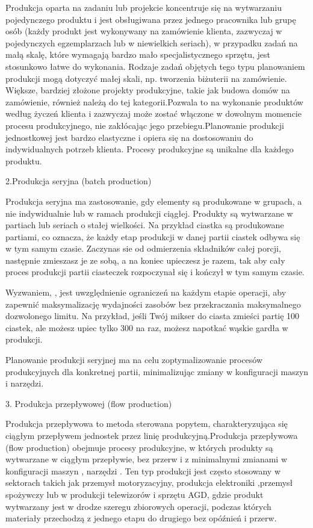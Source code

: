 Produkcja oparta na zadaniu lub projekcie koncentruje się na wytwarzaniu pojedynczego produktu i jest obsługiwana przez jednego pracownika lub grupę osób (każdy produkt jest wykonywany na zamówienie klienta, zazwyczaj w pojedynczych egzemplarzach lub w niewielkich seriach), w przypadku zadań na małą skalę, które wymagają bardzo mało specjalistycznego sprzętu, jest stosunkowo łatwe do wykonania. Rodzaje zadań objętych tego typu planowaniem produkcji mogą dotyczyć małej skali, np. tworzenia biżuterii na zamówienie. Większe, bardziej złożone projekty produkcyjne, takie jak budowa domów na zamówienie, również należą do tej kategorii.Pozwala to na wykonanie produktów według życzeń klienta i zazwyczaj może zostać włączone w dowolnym momencie procesu produkcyjnego, nie zakłócając jego przebiegu.Planowanie produkcji jednostkowej jest bardzo elastyczne i opiera się na dostosowaniu do indywidualnych potrzeb klienta. Procesy produkcyjne są unikalne dla każdego produktu.


2.Produkcja seryjna (batch production)

Produkcja seryjna ma zastosowanie, gdy elementy są produkowane w grupach, a nie indywidualnie lub w ramach produkcji ciągłej. Produkty są wytwarzane w partiach lub seriach o stałej wielkości. Na przykład ciastka są produkowane partiami, co oznacza, że każdy etap produkcji w danej partii ciastek odbywa się w tym samym czasie. Zaczynas sie od odmierzenia składników całej porcji, następnie zmieszasz je ze sobą, a na koniec upieczesz je razem, tak aby cały proces produkcji partii ciasteczek rozpoczynał się i kończył w tym samym czasie.

Wyzwaniem, , jest uwzględnienie ograniczeń na każdym etapie operacji, aby zapewnić maksymalizację wydajności zasobów bez przekraczania maksymalnego dozwolonego limitu. Na przykład, jeśli Twój mikser do ciasta zmieści partię 100 ciastek, ale możesz upiec tylko 300 na raz, możesz napotkać wąskie gardła w produkcji.

Planowanie produkcji seryjnej ma na celu zoptymalizowanie procesów produkcyjnych dla konkretnej partii, minimalizując zmiany w konfiguracji maszyn i narzędzi.
    
3. Produkcja przepływowej (flow production)

Produkcja przepływowa to metoda sterowana popytem, charakteryzująca się ciągłym przepływem jednostek przez linię produkcyjną.Produkcja przepływowa (flow production) obejmuje procesy produkcyjne, w których produkty są wytwarzane w ciągłym przepływie, bez przerw i z minimalnymi zmianami w konfiguracji maszyn , narzędzi . Ten typ produkcji jest często stosowany w sektorach takich jak przemysł motoryzacyjny, produkcja elektroniki ,przemysł spożywczy lub w produkcji telewizorów i sprzętu AGD, gdzie produkt wytwarzany jest w drodze szeregu zbiorowych operacji, podczas których materiały przechodzą z jednego etapu do drugiego bez opóźnień i przerw.

